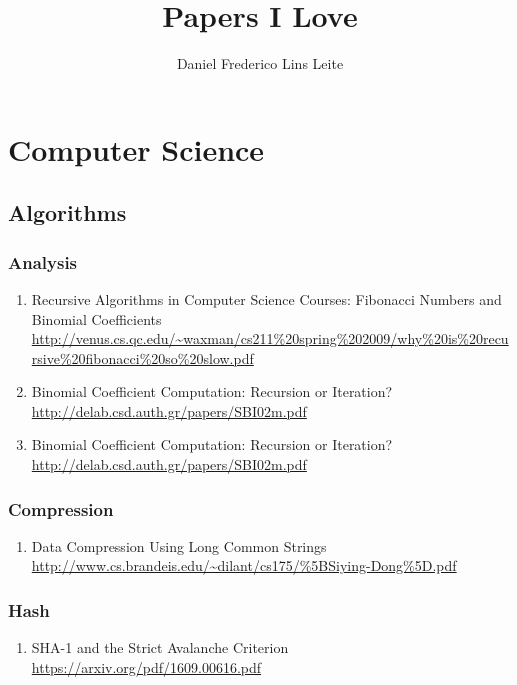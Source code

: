 \documentclass{article}
\begin{document}
\title{Papers I Love}
\author{Daniel Frederico Lins Leite}

\maketitle

\tableofcontents

\section{Computer Science}



\subsection{Algorithms}

\subsubsection{Analysis}
\begin{enumerate}
	\item {Recursive Algorithms in Computer Science Courses: Fibonacci Numbers and Binomial Coefficients\\
\url{http://venus.cs.qc.edu/~waxman/cs211%20spring%202009/why%20is%20recursive%20fibonacci%20so%20slow.pdf}}
	\item {Binomial Coefficient Computation: Recursion or Iteration?\\
\url{http://delab.csd.auth.gr/papers/SBI02m.pdf}}	\item {Binomial Coefficient Computation: Recursion or Iteration?\\
\url{http://delab.csd.auth.gr/papers/SBI02m.pdf}}
	
\end{enumerate}

\subsubsection{Compression}
\begin{enumerate}
\item {Data Compression Using Long Common Strings\\
\url{http://www.cs.brandeis.edu/~dilant/cs175/%5BSiying-Dong%5D.pdf}}
\end{enumerate}

\subsubsection{Hash}
\begin{enumerate}
	\item {SHA-1 and the Strict Avalanche Criterion\\
\url{https://arxiv.org/pdf/1609.00616.pdf}}
\end{enumerate}
\end{document}
